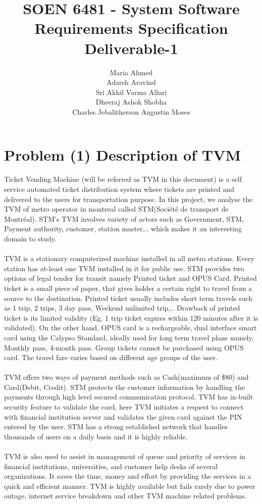 \documentclass[a4paper, 11pt]{report}
\date{}
\title{SOEN 6481 - System Software Requirements Specification
\newline Deliverable-1}
\author{
\normalsize  {Maria Ahmed}\\
\normalsize  {Adarsh Aravind}\\
\normalsize  {Sri Akhil Varma Alluri}\\
\normalsize  {Dheeraj Ashok Shobha}\\
\normalsize  {Charles Jebalitherson Augustin Moses}}
\begin{document}
\maketitle

\chapter{Problem (1) Description of TVM}
Ticket Vending Machine (will be referred as TVM in this document) is a self service automated ticket distribution system where tickets are printed and delivered to the users for transportation purpose. In this project, we analyse the TVM of metro operator in montreal called STM(Société de transport de Montréal). STM's TVM involves variety of actors such as Government, STM, Payment authority, customer, station master,.. which makes it an interesting domain to study. \\\\
TVM is a stationary computerized machine installed in all metro stations. Every station has at-least one TVM installed in it for public use. STM provides two options of legal tender for transit namely Printed ticket and OPUS Card. Printed ticket is a small piece of paper, that gives holder a certain right to travel from a source to the destination. Printed ticket usually includes short term travels such as 1 trip, 2 trips, 3 day pass, Weekend unlimited trip,.. Drawback of printed ticket is its limited validity (Eg. 1 trip ticket expires within 120 minutes after it is validated).  On the other hand, OPUS card is a rechargeable, dual interface smart card using the Calypso Standard, ideally used for long term travel plans namely, Monthly pass, 4-month pass. Group tickets cannot be purchased using OPUS card. The travel fare varies based on different age groups of the user.\\\\
TVM offers two ways of payment methods such as Cash(maximum of \$80) and Card(Debit, Credit).
STM protects the customer information by handling the payments through high level secured communication protocol. TVM has in-built security feature  to validate the card, here TVM initiates a request to connect with financial institution server and validates the given card against the PIN entered by the user. STM has a strong established network that handles thousands of users on a daily basis and it is highly reliable.\\\\
TVM is also used to assist in management of queue and priority of services in financial institutions, universities, and customer help desks of several organizations. It saves the time, money and effort by providing the services in a quick and efficient manner. TVM is highly available but fails rarely due to power outage, internet service breakdown and other TVM machine related problems.\\
\end{document}
